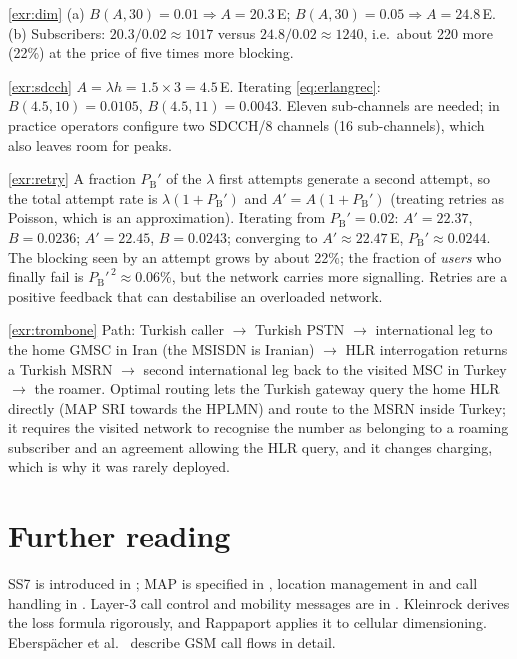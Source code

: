 \documentclass[11pt,a4paper]{article}
\begin{document}
\begin{solutionbox}{\ref{exr:dim}}
(a) $B(A,30)=0.01 \Rightarrow A = 20.3$\,E; $B(A,30)=0.05 \Rightarrow A = 24.8$\,E.
(b) Subscribers: $20.3/0.02 \approx 1017$ versus $24.8/0.02 \approx 1240$, i.e.\ about 220
more (22\%) at the price of five times more blocking.
\end{solutionbox}

\begin{solutionbox}{\ref{exr:sdcch}}
$A = \lambda h = 1.5\times3 = 4.5$\,E. Iterating \cref{eq:erlangrec}: $B(4.5,10)=0.0105$,
$B(4.5,11)=0.0043$. Eleven sub-channels are needed; in practice operators configure two
SDCCH/8 channels (16 sub-channels), which also leaves room for peaks.
\end{solutionbox}

\begin{solutionbox}{\ref{exr:retry}}
A fraction $P_{\mathrm{B}}'$ of the $\lambda$ first attempts generate a second attempt, so
the total attempt rate is $\lambda(1+P_{\mathrm{B}}')$ and $A' = A(1+P_{\mathrm{B}}')$ (treating
retries as Poisson, which is an approximation). Iterating from $P_{\mathrm{B}}'=0.02$:
$A' = 22.37$, $B = 0.0236$; $A' = 22.45$, $B = 0.0243$; converging to
$A' \approx 22.47$\,E, $P_{\mathrm{B}}' \approx 0.0244$. The blocking seen by an attempt grows by
about 22\%; the fraction of \emph{users} who finally fail is $P_{\mathrm{B}}'^{\,2}\approx 0.06\%$,
but the network carries more signalling. Retries are a positive feedback that can
destabilise an overloaded network.
\end{solutionbox}

\begin{solutionbox}{\ref{exr:trombone}}
Path: Turkish caller $\to$ Turkish PSTN $\to$ international leg to the home GMSC in Iran
(the MSISDN is Iranian) $\to$ HLR interrogation returns a Turkish MSRN $\to$ second
international leg back to the visited MSC in Turkey $\to$ the roamer. Optimal routing
lets the Turkish gateway query the home HLR directly (MAP SRI towards the HPLMN) and route
to the MSRN inside Turkey; it requires the visited network to recognise the number as
belonging to a roaming subscriber and an agreement allowing the HLR query, and it changes
charging, which is why it was rarely deployed.
\end{solutionbox}

\section{Further reading}
SS7 is introduced in \cite{ituq700}; MAP is specified in \cite{ts29002}, location
management in \cite{ts23012} and call handling in \cite{ts23018}. Layer-3 call control and
mobility messages are in \cite{ts24008}. Kleinrock \cite{kleinrock1975queueing} derives
the loss formula rigorously, and Rappaport \cite{rappaport2002wireless} applies it to
cellular dimensioning. Eberspächer et al.\ \cite{eberspaecher2009gsm} describe GSM call
flows in detail.

\printbibliography[heading=subbibliography,title={\ACNstrRefs}]
\end{document}

